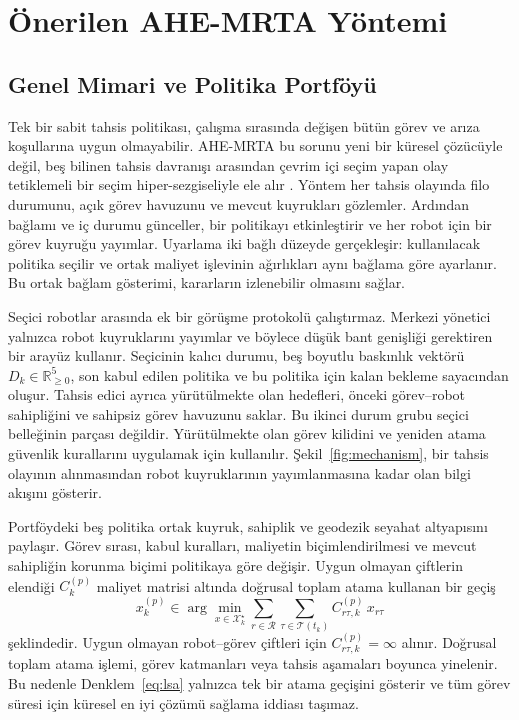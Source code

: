 \documentclass[10pt,letterpaper,onecolumn]{IEEEtran}
\begin{document}
\section{Önerilen AHE-MRTA Yöntemi}
\label{sec:method}

\subsection{Genel Mimari ve Politika Portföyü}
\label{sec:method-overview}

Tek bir sabit tahsis politikası, çalışma sırasında değişen bütün görev ve arıza
koşullarına uygun olmayabilir. AHE-MRTA bu sorunu yeni bir küresel çözücüyle
değil, beş bilinen tahsis davranışı arasından çevrim içi seçim yapan olay
tetiklemeli bir seçim hiper-sezgiseliyle ele alır \cite{burke2013hyper}. Yöntem
her tahsis olayında filo durumunu, açık görev havuzunu ve mevcut kuyrukları
gözlemler. Ardından bağlamı ve iç durumu günceller, bir politikayı etkinleştirir
ve her robot için bir görev kuyruğu yayımlar. Uyarlama iki bağlı düzeyde
gerçekleşir: kullanılacak politika seçilir ve ortak maliyet işlevinin
ağırlıkları aynı bağlama göre ayarlanır. Bu ortak bağlam gösterimi, kararların
izlenebilir olmasını sağlar.

Seçici robotlar arasında ek bir görüşme protokolü çalıştırmaz. Merkezi yönetici
yalnızca robot kuyruklarını yayımlar ve böylece düşük bant genişliği gerektiren
bir arayüz kullanır. Seçicinin kalıcı durumu, beş boyutlu baskınlık vektörü
$D_k\in\mathbb{R}_{\geq0}^{5}$, son kabul edilen politika ve bu politika için
kalan bekleme sayacından oluşur. Tahsis edici ayrıca yürütülmekte olan
hedefleri, önceki görev--robot sahipliğini ve sahipsiz görev havuzunu saklar.
Bu ikinci durum grubu seçici belleğinin parçası değildir. Yürütülmekte olan
görev kilidini ve yeniden atama güvenlik kurallarını uygulamak için kullanılır.
Şekil~\ref{fig:mechanism}, bir tahsis olayının alınmasından robot kuyruklarının
yayımlanmasına kadar olan bilgi akışını gösterir.

\label{sec:paradigms}

Portföydeki beş politika ortak kuyruk, sahiplik ve geodezik seyahat
altyapısını paylaşır.
Görev sırası, kabul kuralları, maliyetin biçimlendirilmesi ve mevcut sahipliğin
korunma biçimi politikaya göre değişir. Uygun olmayan çiftlerin elendiği
$C^{(p)}_k$ maliyet matrisi altında doğrusal toplam atama kullanan bir geçiş
\begin{equation}
  x^{(p)}_k\in\arg\min_{x\in\mathcal X_k^\star}
  \sum_{r\in\mathcal R}\sum_{\tau\in\mathcal T(t_k)}
  C^{(p)}_{r\tau,k}\,x_{r\tau}
  \label{eq:lsa}
\end{equation}
şeklindedir. Uygun olmayan robot--görev çiftleri için
$C^{(p)}_{r\tau,k}=\infty$ alınır. Doğrusal toplam atama işlemi, görev
katmanları veya tahsis aşamaları boyunca yinelenir. Bu nedenle
Denklem~\eqref{eq:lsa} yalnızca tek bir atama geçişini gösterir ve tüm görev
süresi için küresel en iyi çözümü sağlama iddiası taşımaz.
\end{document}
